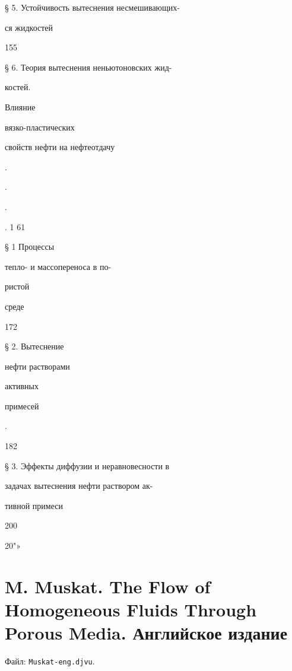 \documentclass[
  11pt,
]{article}
\begin{document}
§ 5. Устойчивость вытеснения несмешивающих-\par
ся жидкостей \par
155\par
§ 6. Теория вытеснения неньютоновских жид-\par
костей. \par
Влияние \par
вязко-пластических\par
свойств нефти на нефтеотдачу \textquotesingle{} \par
.\par
.\par
.\par
. 1 61\par
§ 1 Процессы \par
тепло- и массопереноса в по-\par
ристой \par
среде \par
172\par
§ 2. Вытеснение \par
нефти растворами \par
активных\par
примесей \par
. \par
182\par
§ 3. Эффекты диффузии и неравновесности в\par
задачах вытеснения нефти раствором ак-\par
тивной примеси \par
200\par
20"»\par
\endgroup


\section{M. Muskat. The Flow of Homogeneous Fluids Through Porous Media. Английское издание}\label{section-16}

Файл: \texttt{Muskat-eng.djvu}.
\end{document}
